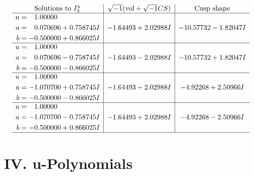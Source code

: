 \documentclass[1p]{elsarticle_modified}
\theoremstyle{definition}
\newcommand{\I}{\sqrt{-1}}
\begin{document}
$$\begin{array}{c|c|c}  
\text{Solutions to }I^u_{3}& \I (\text{vol} + \sqrt{-1}CS) & \text{Cusp shape}\\
 \hline 
\begin{aligned}
u &= \phantom{-}1.00000\phantom{ +0.000000I} \\
a &= \phantom{-}0.070696 + 0.758745 I \\
b &= -0.500000 + 0.866025 I\end{aligned}
 & -1.64493 + 2.02988 I & -10.57732 - 1.82047 I \\ \hline\begin{aligned}
u &= \phantom{-}1.00000\phantom{ +0.000000I} \\
a &= \phantom{-}0.070696 - 0.758745 I \\
b &= -0.500000 - 0.866025 I\end{aligned}
 & -1.64493 - 2.02988 I & -10.57732 + 1.82047 I \\ \hline\begin{aligned}
u &= \phantom{-}1.00000\phantom{ +0.000000I} \\
a &= -1.070700 + 0.758745 I \\
b &= -0.500000 - 0.866025 I\end{aligned}
 & -1.64493 - 2.02988 I & -4.92268 + 2.50966 I \\ \hline\begin{aligned}
u &= \phantom{-}1.00000\phantom{ +0.000000I} \\
a &= -1.070700 - 0.758745 I \\
b &= -0.500000 + 0.866025 I\end{aligned}
 & -1.64493 + 2.02988 I & -4.92268 - 2.50966 I\\
 \hline 
 \end{array}$$\newpage
\newpage\renewcommand{\arraystretch}{1}
\centering \section*{ IV. u-Polynomials}
\end{document}
